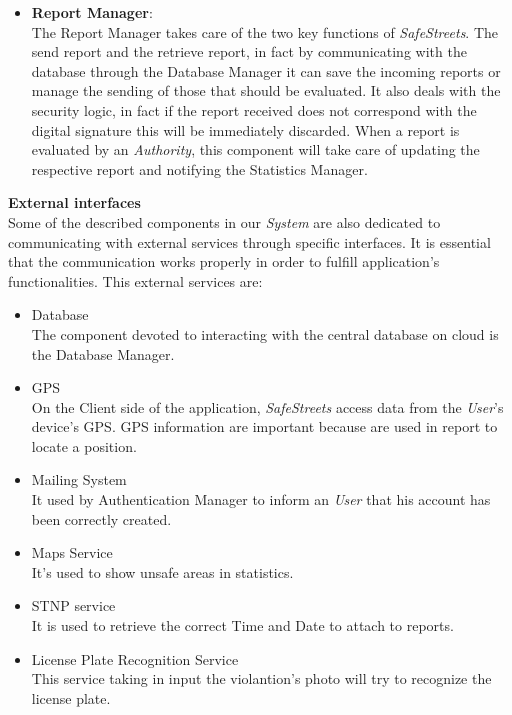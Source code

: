 \documentclass{article}
\begin{document}
\begin{itemize}
\item \textbf{Report Manager}: \\
The Report Manager takes care of the two key functions of \textit{SafeStreets}. The send report and 
the retrieve report, in fact by communicating with the database through the Database Manager 
it can save the incoming reports or manage the sending of those that should be evaluated. 
It also deals with the security logic, in fact if the report received does not correspond 
with the digital signature this will be immediately discarded. When a report is evaluated 
by an \textit{Authority}, this component will take care of updating the respective report and 
notifying the Statistics Manager.
\end{itemize}

\clearpage
\textbf{External interfaces} \\
Some of the described components in our \textit{System} are also dedicated to communicating 
with external services through specific interfaces. It is essential that the communication 
works properly in order to fulfill application's functionalities.
This external services are:
\begin{itemize}
    \item Database \\
    The component devoted to interacting with the central database on 
    cloud is the Database Manager.
    \item GPS \\
    On the Client side of the application, \textit{SafeStreets} access data from 
    the \textit{User}'s device's GPS. GPS information are important because are used in 
    report to locate a position. 
    \item Mailing System \\
    It used by Authentication Manager to inform an \textit{User} that his account 
    has been correctly created. 
    \item Maps Service \\ 
    It's used to show unsafe areas in statistics.  
    \item STNP service \\
    It is used to retrieve the correct Time and Date to attach to reports.
    \item License Plate Recognition Service \\
    This service taking in input the violantion's photo will try to recognize the license plate.
\end{itemize} 
\end{document}
